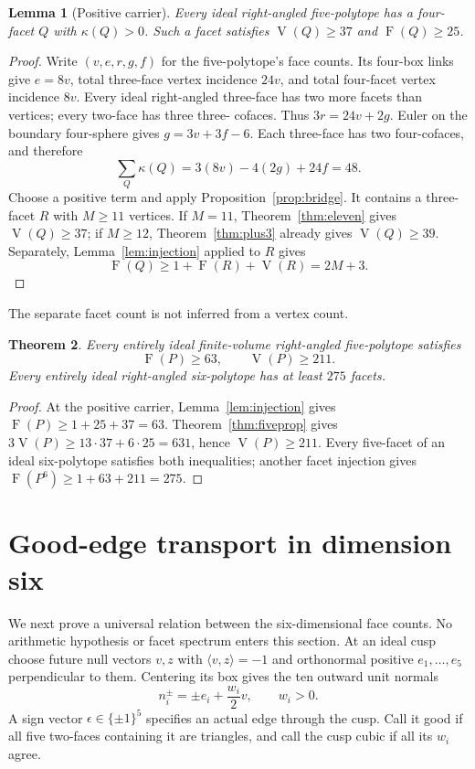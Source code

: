 \documentclass[11pt]{article}
\newtheorem{theorem}{Theorem}[section]
\newtheorem{lemma}[theorem]{Lemma}
\theoremstyle{remark}
\newcommand{\VV}{\operatorname{V}}
\newcommand{\FF}{\operatorname{F}}
\newcommand{\ip}[2]{\langle #1,#2\rangle}
\begin{document}
\begin{lemma}[Positive carrier]\label{lem:carrier}
Every ideal right-angled five-polytope has a four-facet $Q$ with
$\kappa(Q)>0$. Such a facet satisfies $\VV(Q)\ge37$ and $\FF(Q)\ge25$.
\end{lemma}
\begin{proof}
Write $(v,e,r,g,f)$ for the five-polytope's face counts. Its four-box
links give $e=8v$, total three-face vertex incidence $24v$, and total
four-facet vertex incidence $8v$. Every ideal right-angled three-face
has two more facets than vertices; every two-face has three three-
cofaces. Thus $3r=24v+2g$. Euler on the boundary four-sphere gives
$g=3v+3f-6$. Each three-face has two four-cofaces, and therefore
\begin{equation}\label{eq:kappasum}
 \sum_Q\kappa(Q)=3(8v)-4(2g)+24f=48.
\end{equation}
Choose a positive term and apply Proposition~\ref{prop:bridge}.
It contains a three-facet $R$ with $M\ge11$ vertices. If $M=11$,
Theorem~\ref{thm:eleven} gives $\VV(Q)\ge37$; if $M\ge12$,
Theorem~\ref{thm:plus3} already gives $\VV(Q)\ge39$.
Separately, Lemma~\ref{lem:injection} applied to $R$ gives
\begin{equation}\label{eq:carrierFacets}
 \FF(Q)\ge1+\FF(R)+\VV(R)=2M+3.
\end{equation}
\end{proof}
The separate facet count is not inferred from a vertex count.

\begin{theorem}\label{thm:fivebounds}
Every entirely ideal finite-volume right-angled five-polytope satisfies
\[
 \FF(P)\ge63,\qquad \VV(P)\ge211.
\]
Every entirely ideal right-angled six-polytope has at least $275$ facets.
\end{theorem}
\begin{proof}
At the positive carrier, Lemma~\ref{lem:injection} gives
$\FF(P)\ge1+25+37=63$.
Theorem~\ref{thm:fiveprop} gives $3\VV(P)\ge13\cdot37+6\cdot25=631$,
hence $\VV(P)\ge211$. Every five-facet of an ideal six-polytope
satisfies both inequalities; another facet injection gives
$\FF(P^6)\ge1+63+211=275$.
\end{proof}

\section{Good-edge transport in dimension six}\label{sec:transport}

We next prove a universal relation between the six-dimensional face
counts. No arithmetic hypothesis or facet spectrum enters this section.
At an ideal cusp choose future null vectors $v,z$ with $\ip{v}{z}=-1$
and orthonormal positive $e_1,\ldots,e_5$ perpendicular to them.
Centering its box gives the ten outward unit normals
\begin{equation}\label{eq:frame}
 n_i^\pm=\pm e_i+\frac{w_i}{2}v,\qquad w_i>0.
\end{equation}
A sign vector $\epsilon\in\{\pm1\}^5$ specifies an actual edge through
the cusp. Call it good if all five two-faces containing it are triangles,
and call the cusp cubic if all its $w_i$ agree.
\end{document}
